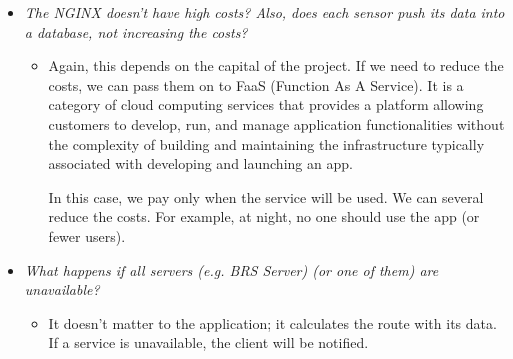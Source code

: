 \documentclass[a4paper]{article}
\begin{document}
\begin{itemize}[label=]
        \item \emph{The NGINX doesn't have high costs? Also, does each sensor push its data into a database, not increasing the costs?}
        \begin{itemize}[label=]
            \item Again, this depends on the capital of the project. If we need to reduce the costs, we can pass them on to FaaS (Function As A Service). It is a category of cloud computing services that provides a platform allowing customers to develop, run, and manage application functionalities without the complexity of building and maintaining the infrastructure typically associated with developing and launching an app.
            
            In this case, we pay only when the service will be used. We can several reduce the costs. For example, at night, no one should use the app (or fewer users).
        \end{itemize}
        
        \item \emph{What happens if all servers (e.g. BRS Server) (or one of them) are unavailable?}
        \begin{itemize}[label=]
            \item It doesn't matter to the application; it calculates the route with its data. If a service is unavailable, the client will be notified.
        \end{itemize}
    \end{itemize}

    \newpage

    \pagestyle{fancy}
    \fancyhead{} %
    \fancyhead[R]{\nouppercase{\leftmark}}

    {}
    
\end{document}
